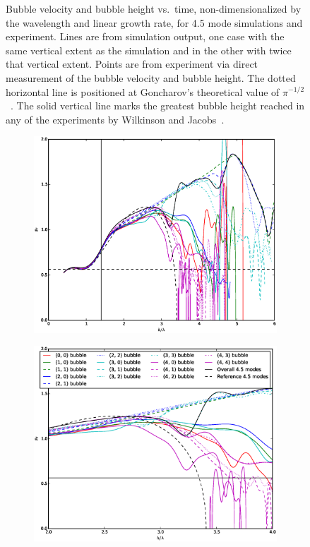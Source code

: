 \begin{figure}
\begin{subfigure}[b]{0.5\textwidth}
\end{subfigure}
\caption{ 
Bubble velocity and bubble height vs.\ time, non-dimensionalized by the wavelength and linear growth rate, for 4.5 mode simulations and experiment.
Lines are from simulation output, one case with the same vertical extent as the simulation and in the other with twice that vertical extent.
Points are from experiment via direct measurement of the bubble velocity and bubble height.
The dotted horizontal line is positioned at Goncharov's theoretical value of $\pi^{-1/2}$~\cite{Goncharov2002}.
The solid vertical line marks the greatest bubble height reached in any of the experiments by Wilkinson and Jacobs~\cite{Wilkinson2007}.
}
\end{figure}

\begin{figure}
\begin{subfigure}[b]{0.32\textwidth}
  \includegraphics[width=\textwidth]{plts/Fr_long_walls}
\end{subfigure}
\begin{subfigure}[b]{0.32\textwidth}
  \includegraphics[width=\textwidth]{plts/Fr_long_walls_zoom1}

\end{subfigure}
\end{figure}
